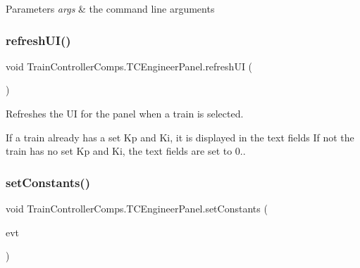 \begin{DoxyParams}{Parameters}
{\em args} & the command line arguments \\
\hline
\end{DoxyParams}
\mbox{\label{classTrainControllerComps_1_1TCEngineerPanel_a9a2caf8e82d4e5107a9d509e2f8e9bab}} 
\subsubsection{\texorpdfstring{refresh\+U\+I()}{refreshUI()}}
{\footnotesize\ttfamily void Train\+Controller\+Comps.\+T\+C\+Engineer\+Panel.\+refresh\+UI (\begin{DoxyParamCaption}{ }\end{DoxyParamCaption})\hspace{0.3cm}{\ttfamily [private]}}



Refreshes the UI for the panel when a train is selected. 

If a train already has a set Kp and Ki, it is displayed in the text fields If not the train has no set Kp and Ki, the text fields are set to 0.. \mbox{\label{classTrainControllerComps_1_1TCEngineerPanel_ade4281b9ba79bf673f52bf43e6a1591b}} 
\subsubsection{\texorpdfstring{set\+Constants()}{setConstants()}}
{\footnotesize\ttfamily void Train\+Controller\+Comps.\+T\+C\+Engineer\+Panel.\+set\+Constants (\begin{DoxyParamCaption}\item[{java.\+awt.\+event.\+Action\+Event}]{evt }\end{DoxyParamCaption})\hspace{0.3cm}{\ttfamily [private]}}



